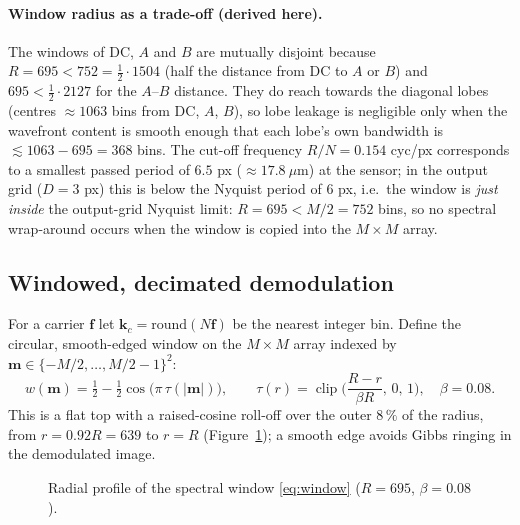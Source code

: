 \documentclass[11pt,a4paper]{article}
\theoremstyle{definition}
\newcommand{\vf}{\bm{f}}
\DeclareMathOperator{\clip}{clip}
\begin{document}
\paragraph{Window radius as a trade-off (derived here).}
The windows of $\mathrm{DC}$, $A$ and $B$ are mutually disjoint because $R=695<752=\tfrac12\cdot1504$ (half the distance from DC to $A$ or $B$)
and $695<\tfrac12\cdot2127$ for the $A$--$B$ distance. They do reach towards the diagonal lobes (centres $\approx1063$ bins from DC, $A$, $B$), so lobe leakage
is negligible only when the wavefront content is smooth enough that each lobe's own bandwidth is $\lesssim1063-695=368$ bins. The cut-off frequency $R/N=0.154$ cyc/px corresponds to
a smallest passed period of $6.5$ px ($\approx17.8\ \mu$m) at the sensor; in the output grid ($D=3$ px) this is below the Nyquist period of $6$ px, i.e.\ the window is
\emph{just inside} the output-grid Nyquist limit: $R=695<M/2=752$ bins, so no spectral wrap-around occurs when the window is copied into the $M\times M$ array.

\subsection{Windowed, decimated demodulation}
For a carrier $\vf$ let $\bm k_c=\mathrm{round}(N\vf)$ be the nearest integer bin. Define the circular, smooth-edged window on the $M\times M$ array
indexed by $\bm m\in\{-M/2,\dots,M/2-1\}^2$:
\begin{equation}
w(\bm m)=\tfrac12-\tfrac12\cos\!\big(\pi\,\tau(|\bm m|)\big),\qquad \tau(r)=\clip\!\Big(\frac{R-r}{\beta R},\,0,\,1\Big),\quad\beta=0.08 .
\label{eq:window}
\end{equation}
This is a flat top with a raised-cosine roll-off over the outer $8\,\%$ of the radius, from $r=0.92R=639$ to $r=R$ (Figure~\ref{fig:taper}); a smooth edge avoids Gibbs ringing in the demodulated image.
\begin{figure}[h]
\centering
{}
\caption{Radial profile of the spectral window \eqref{eq:window} ($R=695$, $\beta=0.08$).}
\label{fig:taper}
\end{figure}
\end{document}

